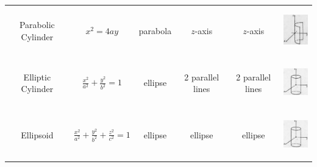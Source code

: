 \documentclass[fleqn, a4paper, 8pt, twoside]{amsart}
\theoremstyle{definition}
\theoremstyle{bluedefinition}
\theoremstyle{redtheorem}
\begin{document}
\begin{tabular}{|c|c|c|c|c|c|}
	Parabolic Cylinder        & $x^2 = 4 a y$                                              & parabola             & $z$-axis             & $z$-axis              & \includegraphics[height = 2cm]{Parabolic_cylinder.jpg}      \\
	Elliptic Cylinder         & $\frac{x^2}{a^2} + \frac{y^2}{b^2} = 1$                    & ellipse              & 2 parallel lines     & 2 parallel lines      & \includegraphics[height = 2cm]{Elliptic_cylinder.jpg}       \\
	Ellipsoid                 & $\frac{x^2}{a^2} + \frac{y^2}{b^2} + \frac{z^2}{c^2} = 1$  & ellipse              & ellipse              & ellipse               & \includegraphics[height = 2cm]{Elliptic_cylinder.jpg}       \\
	\hline
\end{tabular}
\end{document}
